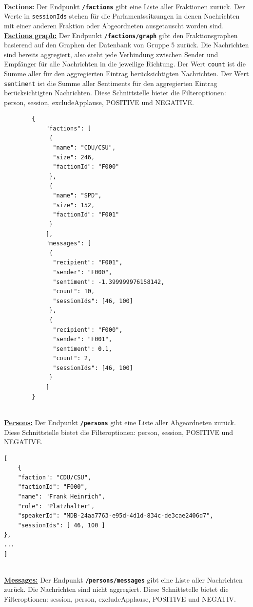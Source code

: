 ~\\	
\textbf{\underline{Factions:}} 
\newline
Der Endpunkt \textbf{\texttt{/factions}} gibt eine Liste aller Fraktionen zurück. Der Werte in \texttt{sessionIds} stehen für die Parlamentssitzungen in denen Nachrichten mit einer anderen Fraktion oder Abgeordneten ausgetauscht worden sind.
\newpage
~\\		
\textbf{\underline{Factions graph:}} \newline
Der Endpunkt \textbf{\texttt{/factions/graph}} gibt den Fraktionsgraphen basierend auf den Graphen der Datenbank von Gruppe 5 zurück. Die Nachrichten sind bereits aggregiert, also steht jede Verbindung zwischen Sender und Empfänger für alle Nachrichten in die jeweilige Richtung. Der Wert \texttt{count} ist die Summe aller für den aggregierten Eintrag berücksichtigten Nachrichten. Der Wert \texttt{sentiment} ist die Summe aller Sentiments für den aggregierten Eintrag berücksichtigten Nachrichten. Diese Schnittstelle bietet die Filteroptionen: person, session, excludeApplause, POSITIVE und NEGATIVE.	
\begin{lstlisting}
		{
			"factions": [
			 {
			  "name": "CDU/CSU",
			  "size": 246, 
			  "factionId": "F000"
			 },
			 {
			  "name": "SPD",
			  "size": 152,
			  "factionId": "F001"
			 }
			],
			"messages": [
			 {
			  "recipient": "F001",
			  "sender": "F000",
			  "sentiment": -1.399999976158142,
			  "count": 10,
			  "sessionIds": [46, 100]
			 },
			 {
			  "recipient": "F000",
			  "sender": "F001",
			  "sentiment": 0.1,
			  "count": 2,
			  "sessionIds": [46, 100]
			 }
			]
		}
\end{lstlisting}
\newpage
~\\	
\textbf{\underline{Persons:}}\newline
Der Endpunkt \textbf{\texttt{/persons}} gibt eine Liste aller Abgeordneten zurück. Diese Schnittstelle bietet die Filteroptionen: person, session, POSITIVE und NEGATIVE.
\begin{lstlisting}
[
    {
    "faction": "CDU/CSU",
    "factionId": "F000", 
    "name": "Frank Heinrich", 
    "role": "Platzhalter", 
    "speakerId": "MDB-24aa7763-e95d-4d1d-834c-de3cae2406d7",
    "sessionIds": [ 46, 100 ]
}, 
...
]
\end{lstlisting}
~\\
\textbf{\underline{Messages:}}\newline
Der Endpunkt \textbf{\texttt{/persons/messages}} gibt eine Liste aller Nachrichten zurück. Die Nachrichten sind nicht aggregiert. Diese Schnittstelle bietet die Filteroptionen: session, person, excludeApplause, POSITIVE und NEGATIV.	
